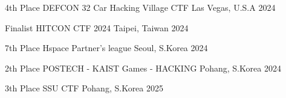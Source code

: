 



\begin{cvhonors}

  \cvhonor
    {4th Place} %
    {DEFCON 32 Car Hacking Village CTF } %
    {Las Vegas, U.S.A} %
    {2024} %

  \cvhonor
    {Finalist} %
    {HITCON CTF 2024} %
    {Taipei, Taiwan} %
    {2024} %

\end{cvhonors}




\begin{cvhonors}

  \cvhonor
    {7th Place} %
    {Hspace Partner's league} %
    {Seoul, S.Korea} %
    {2024} %

  \cvhonor
    {2th Place} %
    {POSTECH - KAIST Games - HACKING} %
    {Pohang, S.Korea} %
    {2024} %

  \cvhonor
    {3th Place} %
    {SSU CTF} %
    {Pohang, S.Korea} %
    {2025} %



\end{cvhonors}
